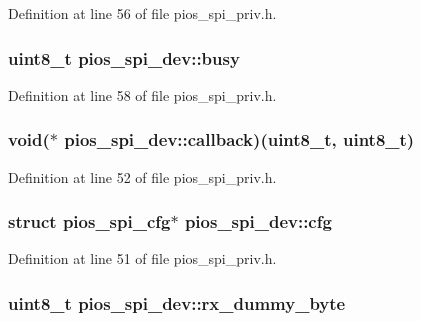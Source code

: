 \-Definition at line 56 of file pios\-\_\-spi\-\_\-priv.\-h.

\hypertarget{structpios__spi__dev_a90778ce216b2c078f3c6dade52f3f2be}{
\subsubsection[{busy}]{\setlength{\rightskip}{0pt plus 5cm}uint8\-\_\-t {\bf pios\-\_\-spi\-\_\-dev\-::busy}}}\label{structpios__spi__dev_a90778ce216b2c078f3c6dade52f3f2be}


\-Definition at line 58 of file pios\-\_\-spi\-\_\-priv.\-h.

\hypertarget{structpios__spi__dev_a15f1ecafedc8c12d37bf9bf066b993c6}{
\subsubsection[{callback}]{\setlength{\rightskip}{0pt plus 5cm}void($\ast$ {\bf pios\-\_\-spi\-\_\-dev\-::callback})(uint8\-\_\-t, uint8\-\_\-t)}}\label{structpios__spi__dev_a15f1ecafedc8c12d37bf9bf066b993c6}


\-Definition at line 52 of file pios\-\_\-spi\-\_\-priv.\-h.

\hypertarget{structpios__spi__dev_afcd7e74a6f561b546a7b828466a12f94}{
\subsubsection[{cfg}]{\setlength{\rightskip}{0pt plus 5cm}struct {\bf pios\-\_\-spi\-\_\-cfg}$\ast$ {\bf pios\-\_\-spi\-\_\-dev\-::cfg}}}\label{structpios__spi__dev_afcd7e74a6f561b546a7b828466a12f94}


\-Definition at line 51 of file pios\-\_\-spi\-\_\-priv.\-h.

\hypertarget{structpios__spi__dev_a003d648a4e5f69fab071c4ed53059418}{
\subsubsection[{rx\-\_\-dummy\-\_\-byte}]{\setlength{\rightskip}{0pt plus 5cm}uint8\-\_\-t {\bf pios\-\_\-spi\-\_\-dev\-::rx\-\_\-dummy\-\_\-byte}}}\label{structpios__spi__dev_a003d648a4e5f69fab071c4ed53059418}


